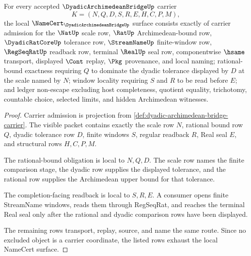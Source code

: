 \begin{theorem}
\label{thm:dyadic-archimedean-bridge-namecert-obligations}
For every accepted $\DyadicArchimedeanBridgeUp$ carrier
$$
K=(N,Q,D,S,R,E,H,C,P,M),
$$
the local $\NameCert_{\DyadicArchimedeanBridgeUp}$ surface consists exactly of carrier admission for the $\NatUp$ scale row, $\RatUp$ Archimedean-bound row, $\DyadicRatCoreUp$ tolerance row, $\StreamNameUp$ finite-window row, $\RegSeqRatUp$ readback row, terminal $\RealUp$ seal row, componentwise $\hsame$ transport, displayed $\Cont$ replay, $\Pkg$ provenance, and local naming; rational-bound exactness requiring $Q$ to dominate the dyadic tolerance displayed by $D$ at the scale named by $N$; window locality requiring $S$ and $R$ to be read before $E$; and ledger non-escape excluding host completeness, quotient equality, trichotomy, countable choice, selected limits, and hidden Archimedean witnesses.
\end{theorem}
\begin{proof}
Carrier admission is projection from \autoref{def:dyadic-archimedean-bridge-carrier}. The visible packet contains exactly the scale row $N$, rational bound row $Q$, dyadic tolerance row $D$, finite windows $S$, regular readback $R$, Real seal $E$, and structural rows $H,C,P,M$.

The rational-bound obligation is local to $N,Q,D$. The scale row names the finite comparison stage, the dyadic row supplies the displayed tolerance, and the rational row supplies the Archimedean upper bound for that tolerance.

The completion-facing readback is local to $S,R,E$. A consumer opens finite StreamName windows, reads them through RegSeqRat, and reaches the terminal Real seal only after the rational and dyadic comparison rows have been displayed.

The remaining rows transport, replay, source, and name the same route. Since no excluded object is a carrier coordinate, the listed rows exhaust the local NameCert surface.
\end{proof}


